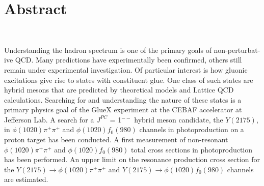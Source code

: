 \section*{Abstract} %

~\par Understanding the hadron spectrum is one of the primary goals of non-perturbat-ive QCD. Many predictions have experimentally been confirmed, others still remain under experimental investigation. Of particular interest is how gluonic excitations give rise to states with constituent glue. One class of such states are hybrid mesons that are predicted by theoretical models and Lattice QCD calculations. Searching for and understanding the nature of these states is a primary physics goal of the GlueX experiment at the CEBAF accelerator at Jefferson Lab. A search for a $J^{PC}$ = 1$^{--}$ hybrid meson candidate, the $Y(2175)$, in $\phi(1020)\pi^{+}\pi^{+}$ and $\phi(1020)f_{0}(980)$ channels in photoproduction on a proton target has been conducted. A first measurement of non-resonant $\phi(1020)\pi^{+}\pi^{+}$ and $\phi(1020)f_{0}(980)$ total cross sections in photoproduction has been performed. An upper limit on the resonance production cross section for the $Y(2175) \rightarrow \phi(1020)\pi^{+}\pi^{+}$ and $Y(2175) \rightarrow \phi(1020)f_0(980)$ channels are estimated.